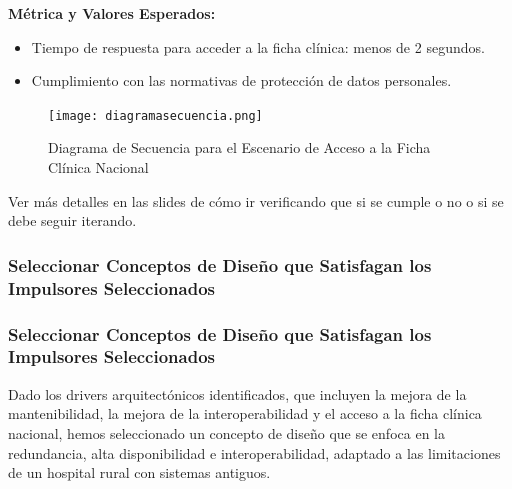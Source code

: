 \textbf{Métrica y Valores Esperados:}
\begin{itemize}
    \item Tiempo de respuesta para acceder a la ficha clínica: menos de 2 segundos.
    \item Cumplimiento con las normativas de protección de datos personales.
\end{itemize}


\begin{figure}[h]
    \centering
    \texttt{[image: diagramasecuencia.png]}
    \caption{Diagrama de Secuencia para el Escenario de Acceso a la Ficha Clínica Nacional}
    \label{fig:diagrama_secuencia}
\end{figure}
Ver más detalles en las slides de cómo ir verificando que si se cumple o no o si se debe seguir iterando. 

\subsubsection{Seleccionar Conceptos de Diseño que Satisfagan los Impulsores Seleccionados}


\subsubsection{Seleccionar Conceptos de Diseño que Satisfagan los Impulsores Seleccionados}

Dado los drivers arquitectónicos identificados, que incluyen la mejora de la mantenibilidad, la mejora de la interoperabilidad y el acceso a la ficha clínica nacional, hemos seleccionado un concepto de diseño que se enfoca en la redundancia, alta disponibilidad e interoperabilidad, adaptado a las limitaciones de un hospital rural con sistemas antiguos.

